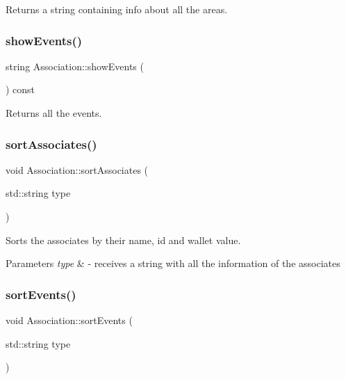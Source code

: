 Returns a string containing info about all the areas. 

\mbox{\label{classAssociation_aff3817596c302056ca73ca6a98e7bf3c}} 
\subsubsection{\texorpdfstring{show\+Events()}{showEvents()}}
{\footnotesize\ttfamily string Association\+::show\+Events (\begin{DoxyParamCaption}{ }\end{DoxyParamCaption}) const}



Returns all the events. 

\mbox{\label{classAssociation_abd9efc23f30a699ff5d2a81bab27b922}} 
\subsubsection{\texorpdfstring{sort\+Associates()}{sortAssociates()}}
{\footnotesize\ttfamily void Association\+::sort\+Associates (\begin{DoxyParamCaption}\item[{std\+::string}]{type }\end{DoxyParamCaption})}



Sorts the associates by their name, id and wallet value. 


\begin{DoxyParams}{Parameters}
{\em type} & -\/ receives a string with all the information of the associates \\
\hline
\end{DoxyParams}
\mbox{\label{classAssociation_a1f50c2dd311479652c3c5bb17d3770dc}} 
\subsubsection{\texorpdfstring{sort\+Events()}{sortEvents()}}
{\footnotesize\ttfamily void Association\+::sort\+Events (\begin{DoxyParamCaption}\item[{std\+::string}]{type }\end{DoxyParamCaption})}



